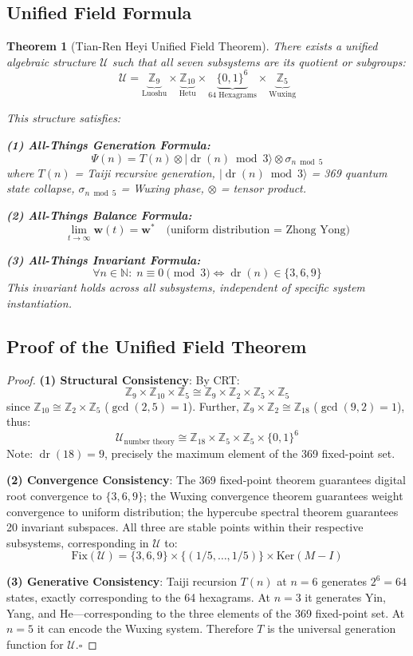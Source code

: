 \documentclass[conference]{IEEEtran}
\newtheorem{theorem}{Theorem}[section]
\theoremstyle{remark}
\newcommand{\Z}{\mathbb{Z}}
\newcommand{\N}{\mathbb{N}}
\newcommand{\U}{\mathcal{U}}
\newcommand{\dr}{\operatorname{dr}}
\newcommand{\IFF}{\Leftrightarrow}
\begin{document}
\subsection{Unified Field Formula}

\begin{theorem}[Tian-Ren Heyi Unified Field Theorem]
There exists a unified algebraic structure $\U$ such that all seven subsystems are its quotient or subgroups:
\[
\U = \underbrace{\Z_9}_{\text{Luoshu}} \times \underbrace{\Z_{10}}_{\text{Hetu}} \times \underbrace{\{0,1\}^6}_{\text{64 Hexagrams}} \times \underbrace{\Z_5}_{\text{Wuxing}}
\]

This structure satisfies:

\textbf{(1) All-Things Generation Formula:}
\[
\Psi(n) = T(n) \otimes |\dr(n) \bmod 3\rangle \otimes \sigma_{n \bmod 5}
\]
where $T(n)$ = Taiji recursive generation, $|\dr(n)\bmod 3\rangle$ = 369 quantum state collapse, $\sigma_{n\bmod 5}$ = Wuxing phase, $\otimes$ = tensor product.

\textbf{(2) All-Things Balance Formula:}
\[
\lim_{t\to\infty} \mathbf{w}(t) = \mathbf{w}^* \quad\text{(uniform distribution = Zhong Yong)}
\]

\textbf{(3) All-Things Invariant Formula:}
\[
\forall n\in\N:\; n \equiv 0 \pmod{3} \IFF \dr(n) \in \{3,6,9\}
\]
This invariant holds across all subsystems, independent of specific system instantiation.
\end{theorem}

\subsection{Proof of the Unified Field Theorem}

\begin{proof}
\textbf{(1) Structural Consistency}: By CRT:
\[
\Z_9 \times \Z_{10} \times \Z_5 \cong \Z_9 \times \Z_2 \times \Z_5 \times \Z_5
\]
since $\Z_{10} \cong \Z_2 \times \Z_5$ ($\gcd(2,5)=1$). Further, $\Z_9 \times \Z_2 \cong \Z_{18}$ ($\gcd(9,2)=1$), thus:
\[
\U_{\text{number theory}} \cong \Z_{18} \times \Z_5 \times \Z_5 \times \{0,1\}^6
\]
Note: $\dr(18)=9$, precisely the maximum element of the 369 fixed-point set.

\textbf{(2) Convergence Consistency}: The 369 fixed-point theorem guarantees digital root convergence to $\{3,6,9\}$; the Wuxing convergence theorem guarantees weight convergence to uniform distribution; the hypercube spectral theorem guarantees 20 invariant subspaces. All three are stable points within their respective subsystems, corresponding in $\U$ to:
\[
\text{Fix}(\U) = \{3,6,9\} \times \{(1/5,\ldots,1/5)\} \times \text{Ker}(M-I)
\]

\textbf{(3) Generative Consistency}: Taiji recursion $T(n)$ at $n=6$ generates $2^6=64$ states, exactly corresponding to the 64 hexagrams. At $n=3$ it generates Yin, Yang, and He---corresponding to the three elements of the 369 fixed-point set. At $n=5$ it can encode the Wuxing system. Therefore $T$ is the universal generation function for $\U$.\hfill$\square$
\end{proof}
\end{document}
